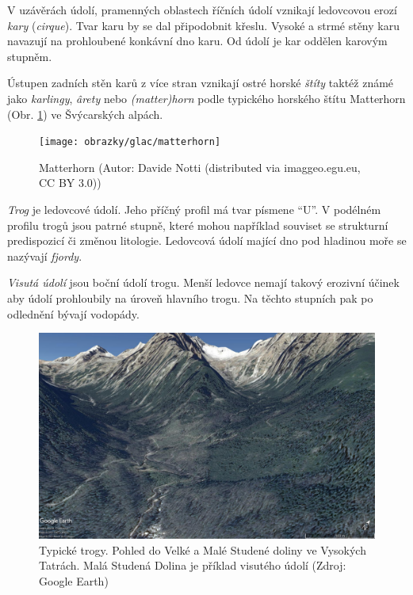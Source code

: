 V uzávěrách údolí, pramenných oblastech říčních údolí vznikají ledovcovou erozí \emph{kary} (\textit{cirque}). Tvar karu by se dal připodobnit křeslu. Vysoké a strmé stěny karu navazují na prohloubené konkávní dno karu. Od údolí je kar oddělen karovým stupněm.

Ústupen zadních stěn karů z více stran vznikají ostré horské \emph{štíty} taktéž známé jako \emph{karlingy}, \emph{\^{a}rety} nebo \emph{(matter)horn} podle typického horského štítu Matterhorn (Obr. \ref{fig:matterhorn}) ve Švýcarských alpách.

\begin{figure}
	\centering
	\texttt{[image: obrazky/glac/matterhorn]}
	\caption{Matterhorn (Autor: Davide Notti (distributed via imaggeo.egu.eu, CC BY 3.0))}
	\label{fig:matterhorn}
\end{figure}

\emph{Trog} je ledovcové údolí. Jeho příčný profil má tvar písmene \enquote{U}. V podélném profilu trogů jsou patrné stupně, které mohou například souviset se strukturní predispozicí či změnou litologie. Ledovcová údolí mající dno pod hladinou moře se nazývají \emph{fjordy}.

\emph{Visutá údolí} jsou boční údolí trogu. Menší ledovce nemají takový erozivní účinek aby údolí prohloubily na úroveň hlavního trogu. Na těchto stupních pak po odlednění bývají vodopády.

\begin{figure}
	\centering
	\includegraphics[width=1\linewidth]{obrazky/glac/studena}
	\caption{Typické trogy. Pohled do Velké a Malé Studené doliny ve Vysokých Tatrách. Malá Studená Dolina je příklad visutého údolí (Zdroj: Google Earth)}
	\label{fig:studena}
\end{figure}

